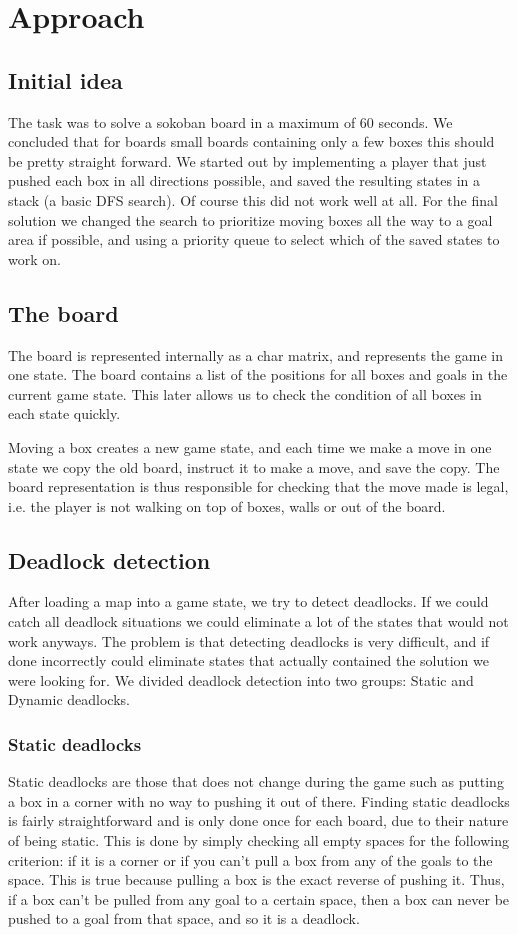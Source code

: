 \documentclass[article,11pt]{article}
\begin{document}
\section{Approach}
\subsection{Initial idea}
The task was to solve a sokoban board in a maximum of 60 seconds. We
concluded that for boards small boards containing only a few boxes
this should be pretty straight forward. We started out by implementing
a player that just pushed each box in all directions possible, and
saved the resulting states in a stack (a basic DFS search). Of course
this did not work well at all. For the final solution we changed the
search to prioritize moving boxes all the way to a goal area if
possible, and using a priority queue to select which of the saved
states to work on. 

\subsection{The board}
The board is represented internally as a char matrix, and represents the game in one state.
The board contains a list of the positions for all boxes and goals in
the current game state. This later allows us to check the condition of
all boxes in each state quickly. 


Moving a box creates a new game state, and each time we make a move in
one state we copy the old board, instruct it to make a move, and save
the copy. The board representation is thus responsible for checking
that the move made is legal, i.e. the player is not walking on top of
boxes, walls or out of the board.


\subsection{Deadlock detection}
After loading a map into a game state, we try to detect deadlocks. If
we could catch all deadlock situations we could eliminate a lot of the
states that would not work anyways. The problem is that detecting
deadlocks is very difficult, and if done incorrectly could eliminate
states that actually contained the solution we were looking for. We
divided deadlock detection into two groups: Static and Dynamic
deadlocks. 

\subsubsection{Static deadlocks}
Static deadlocks are those that does not change during the game such
as putting a box in a corner with no way to pushing it out of
there. Finding static deadlocks is fairly straightforward and is only
done once for each board, due to their nature of being static. This is
done by simply checking all empty spaces for the following criterion:
if it is a corner or if you can’t pull a box from any of the goals to
the space. This is true because pulling a box is the exact reverse of
pushing it. Thus, if a box can’t be pulled from any goal to a certain
space, then a box can never be pushed to a goal from that space, and
so it is a deadlock.
\end{document}
